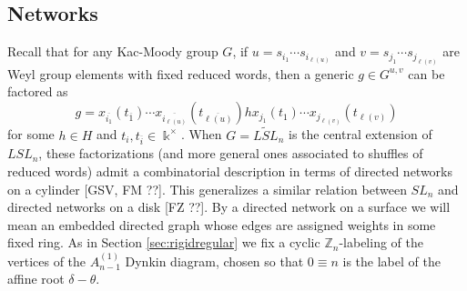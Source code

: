 \documentclass[12pt]{amsart}
\newcommand{\newword}[1]{\textbf{\emph{#1}}}
\newcommand{\CC}{\mathbb{C}}
\newcommand{\ZZ}{\mathbb{Z}}
\newcommand{\kk}{\Bbbk}%
\newcommand{\bfi}{\mathbf{i}}
\newcommand\into{\hookrightarrow}
\newcommand{\ol}[1]{\overline{#1}}
\theoremstyle{remark}
\numberwithin{equation}{section}
\numberwithin{figure}{section}
\begin{document}
\subsection{Networks}\label{sec:networks}

Recall that for any Kac-Moody group $G$, if $u=s_{i_1}\cdots s_{i_{\ell(u)}}$ and $v=s_{j_1}\cdots s_{j_{\ell(v)}}$ are Weyl group elements with fixed reduced words, then a generic $g \in G^{u,v}$ can be factored as
\begin{equation}\label{eq:uvfactorization}
g = x_{\ol{i_1}}(t_{\ol{1}})\cdots x_{\ol{i_{\ell(u)}}}(t_{\ol{\ell(u)}})hx_{j_1}(t_{1}) \cdots x_{j_{\ell(v)}}(t_{\ell(v)})
\end{equation}
for some $h \in H$ and $t_i,t_{\ol{i}} \in \kk^\times$. When $G = \widetilde{LSL}_n$ is the central extension of $LSL_n$, these factorizations (and more general ones associated to shuffles of reduced words) admit a combinatorial description in terms of directed networks on a cylinder [GSV, FM ??]. This generalizes a similar relation between $SL_n$ and directed networks on a disk [FZ ??]. By a directed network on a surface we will mean an embedded directed graph whose edges are assigned weights in some fixed ring. As in Section \ref{sec:rigidregular} we fix a cyclic $\ZZ_n$-labeling of the vertices of the $A_{n-1}^{(1)}$ Dynkin diagram, chosen so that $0 \equiv n$ is the label of the affine root $\delta - \theta$. 


\end{document}
